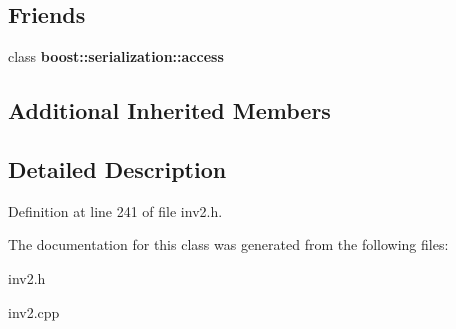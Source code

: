 \subsection*{Friends}
\begin{DoxyCompactItemize}
\item 
\hypertarget{class_ring_ac98d07dd8f7b70e16ccb9a01abf56b9c}{}\label{class_ring_ac98d07dd8f7b70e16ccb9a01abf56b9c} 
class {\bfseries boost\+::serialization\+::access}
\end{DoxyCompactItemize}
\subsection*{Additional Inherited Members}


\subsection{Detailed Description}


Definition at line 241 of file inv2.\+h.



The documentation for this class was generated from the following files\+:\begin{DoxyCompactItemize}
\item 
inv2.\+h\item 
inv2.\+cpp\end{DoxyCompactItemize}
